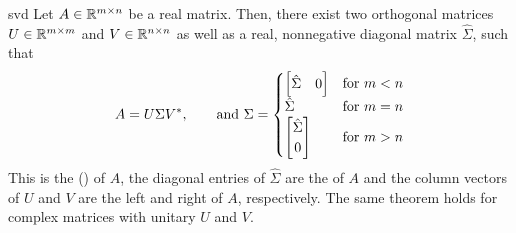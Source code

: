 \begin{Theorem}{svd}
  Let $A\in\mathbb R^{m\times n}$ be a real matrix. Then, there exist two
  orthogonal matrices $U\in\mathbb R^{m\times m}$ and $V\in \mathbb R^{n\times n}$
  as well as a real, nonnegative diagonal matrix $\hat\Sigma$, such
  that
  \begin{gather}
    \label{eq:svd:1}
    A = U \Sigma V^*,
    \qquad\text{and }
    \Sigma =
    \begin{cases}
      \begin{bmatrix}
        \hat\Sigma &0
      \end{bmatrix}
      &\text{for } m<n\\
      \hat\Sigma&\text{for } m=n\\
      \begin{bmatrix}
        \hat\Sigma \\0
      \end{bmatrix}
      &\text{for } m>n
    \end{cases}
  \end{gather}
  This is the  () of
  $A$, the diagonal entries of $\hat \Sigma$ are the
   of $A$ and the column vectors of $U$ and
  $V$ are the left and right  of $A$,
  respectively. The same theorem holds for complex matrices with
  unitary $U$ and $V$.
\end{Theorem}

